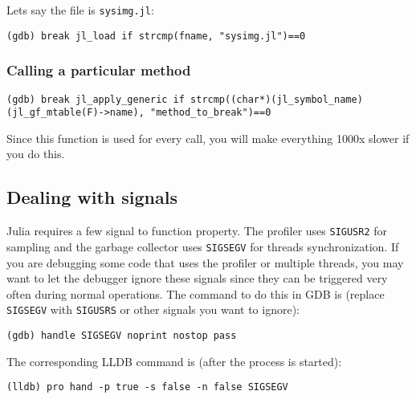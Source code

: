 Let{\textquotesingle}s say the file is \texttt{sysimg.jl}:




\begin{lstlisting}
(gdb) break jl_load if strcmp(fname, "sysimg.jl")==0
\end{lstlisting}



\hypertarget{11262037379695434792}{}


\subsubsection{Calling a particular method}




\begin{lstlisting}
(gdb) break jl_apply_generic if strcmp((char*)(jl_symbol_name)(jl_gf_mtable(F)->name), "method_to_break")==0
\end{lstlisting}



Since this function is used for every call, you will make everything 1000x slower if you do this.



\hypertarget{12553217263049394878}{}


\subsection{Dealing with signals}



Julia requires a few signal to function property. The profiler uses \texttt{SIGUSR2} for sampling and the garbage collector uses \texttt{SIGSEGV} for threads synchronization. If you are debugging some code that uses the profiler or multiple threads, you may want to let the debugger ignore these signals since they can be triggered very often during normal operations. The command to do this in GDB is (replace \texttt{SIGSEGV} with \texttt{SIGUSRS} or other signals you want to ignore):




\begin{lstlisting}
(gdb) handle SIGSEGV noprint nostop pass
\end{lstlisting}



The corresponding LLDB command is (after the process is started):




\begin{lstlisting}
(lldb) pro hand -p true -s false -n false SIGSEGV
\end{lstlisting}



